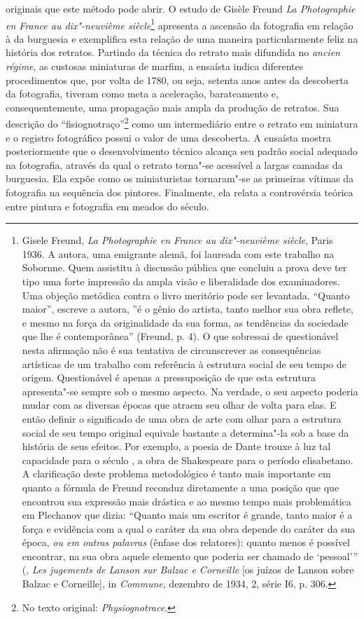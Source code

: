 originais que este método pode abrir. O estudo de Gisèle Freund \emph{La
Photographie en France au dix"-neuvième siècle}\footnote{Gisele Freund,
  \emph{La Photographie en France au dix"-neuvième siècle}, Paris 1936. A
  autora, uma emigrante alemã, foi laureada com este trabalho na
  Sobornne. Quem assistitu à discussão pública que concluiu a prova deve
  ter tipo uma forte impressão da ampla visão e liberalidade dos
  examinadores. Uma objeção metódica contra o livro meritório pode ser
  levantada. ``Quanto maior'', escreve a autora, ''é o gênio do artista,
  tanto melhor sua obra reflete, e mesmo na força da originalidade da
  sua forma, as tendências da sociedade que lhe é contemporânea''
  (Freund, p. 4). O que sobressai de questionável nesta afirmação não é
  sua tentativa de circunscrever as consequências artísticas de um
  trabalho com referência à estrutura social de seu tempo de origem.
  Questionável é apenas a pressuposição de que esta estrutura
  apresenta"-se sempre sob o mesmo aspecto. Na verdade, o seu aspecto
  poderia mudar com as diversas épocas que atraem seu olhar de volta
  para elas. E então definir o significado de uma obra de arte com olhar
  para a estrutura social de seu tempo original equivale bastante a
  determina"-la sob a base da história de seus efeitos. Por exemplo, a
  poesia de Dante trouxe à luz tal capacidade para o século , a obra
  de Shakespeare para o período elisabetano. A clarificação deste
  problema metodológico é tanto mais importante em quanto a fórmula de
  Freund reconduz diretamente a uma posição que que encontrou sua
  expressão mais drástica e ao mesmo tempo mais problemática em
  Plechanov que dizia: ``Quanto mais um escritor é grande, tanto maior é
  a força e evidência com a qual o caráter da sua obra depende do
  caráter da sua época, \emph{ou em outras palavras} (ênfase dos
  relatores): quanto menos é possível encontrar, na sua obra aquele
  elemento que poderia ser chamado de `pessoal''' (,
  \emph{Les jugements de Lanson sur Balzac e Corneille} {[}os juízos de
  Lanson sobre Balzac e Corneille{]}, in \emph{Commune}, dezembro de
  1934, 2, série I6, p. 306.} apresenta a ascensão da fotografia em
relação à da burguesia e exemplifica esta relação de uma maneira
particularmente feliz na história dos retratos. Partindo da técnica do
retrato mais difundida no \emph{ancien régime}, as custosas miniaturas
de marfim, a ensaísta indica diferentes procedimentos que, por volta de
1780, ou seja, setenta anos antes da descoberta da fotografia, tiveram
como meta a aceleração, barateamento e, consequentemente, uma propagação
mais ampla da produção de retratos. Sua descrição do
``fisiognotraço''\footnote{No texto original:
  \emph{Physiognotrace}. \versal{[N. T.]}} como um intermediário entre o retrato em
miniatura e o registro fotográfico possui o valor de uma descoberta. A
ensaísta mostra posteriormente que o desenvolvimento técnico alcança seu
padrão social adequado na fotografia, através da qual o retrato torna"-se
acessível a largas camadas da burguesia. Ela expõe como os miniaturistas
tornaram"-se as primeiras vítimas da fotografia na sequência dos
pintores. Finalmente, ela relata a controvérsia teórica entre pintura e
fotografia em meados do século.


